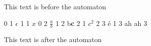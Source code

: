 \documentclass{article}
\begin{document}
This text is before the automaton

\begin{center}
\begin{fsm}
0 1 $\epsilon$
1 1 $x$
0 2 $\frac{a}{b}$
1 2 b{\bf c}
2 1 $c^2$
2 3 {\'e}
1 3 ah ah
3
\end{fsm}
\end{center}

This text is after the automaton
\end{document}
